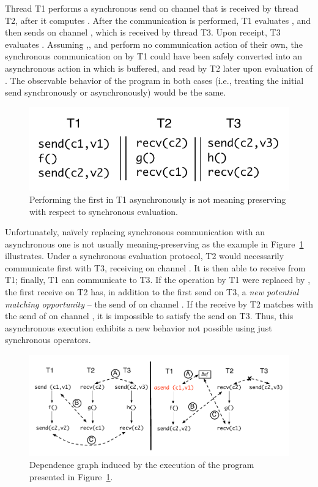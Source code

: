 \noindent Thread T1 performs a synchronous send on channel  that is
received by thread T2, after it computes .  After the communication is
performed, T1 evaluates , and then sends  on channel ,
which is received by thread T3.  Upon receipt, T3 evaluates . Assuming
,, and  perform no communication action of their own, the
synchronous communication on  by T1 could have been safely converted
into an asynchronous action in which  is buffered, and read by T2 later
upon evaluation of .  The observable behavior of the program in both
cases (i.e., treating the initial send synchronously or asynchronously) would
be the same.

\begin{figure}[t]
\centering
\includegraphics[scale=0.8]{Figures/IntroCode2}
\caption{Performing the first  in T1 asynchronously is not meaning
preserving with respect to synchronous evaluation.}
\label{fig:intro2}
\end{figure}

Unfortunately, na\"{i}vely replacing synchronous communication with an
asynchronous one is not usually meaning-preserving as the example in
Figure~\ref{fig:intro2} illustrates. Under a synchronous evaluation protocol,
T2 would necessarily communicate first with T3, receiving  on channel
.  It is then able to receive  from T1; finally, T1 can
communicate  to T3.  If the  operation by T1 were
replaced by , the first receive on T2 has, in addition to the
first send on T3, a \emph{new potential matching opportunity} -- the send of
 on channel . If the receive by T2 matches with the send of
 on channel , it is impossible to satisfy the send on T3. Thus,
this asynchronous execution exhibits a new behavior not possible using just
synchronous operators.

\begin{figure}[t]
\centering
\includegraphics[scale=0.8]{Figures/IntroDepGraph}
\caption{Dependence graph induced by the execution of the program presented in Figure~\ref{fig:intro2}.}
\label{fig:dep_graph}
\end{figure}

